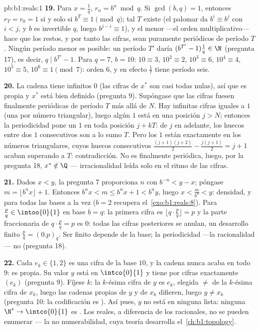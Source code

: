 \begin{solution}{pb:b1:reals:1}
\textbf{19.} Para $x = \frac 1q$, $r_n = b^n \bmod q$. Si
$\gcd(b, q) = 1$, entonces $r_T = r_0 = 1$ si y solo si $b^T \equiv 1
\pmod q$; tal $T$ existe (el palomar da $b^i \equiv b^j$ con $i < j$,
y $b$ es invertible  $q$, luego $b^{j-i} \equiv 1$), y el menor
---el orden multiplicativo--- hace que los restos, y por tanto las
cifras, sean puramente periódicos de período $T$. Ningún período menor
es posible: un período $T'$ daría $(b^{T'} - 1)\frac1q \in \N$
(pregunta 17), es decir, $q \mid b^{T'} - 1$. Para $q = 7$, $b = 10$:
$10 \equiv 3$, $10^2 \equiv 2$, $10^3 \equiv 6$, $10^4 \equiv 4$,
$10^5 \equiv 5$, $10^6 \equiv 1 \pmod 7$: orden $6$, y en efecto
$\frac 17$ tiene período seis.

\textbf{20.} La cadena tiene infinitos $0$ (las cifras de $x^*$ son
casi todas nulas), así que es propia y $x^*$ está bien definido
(pregunta 9). Supóngase que las cifras fuesen finalmente periódicas de
período $T$ más allá de $N$. Hay infinitas cifras iguales a $1$ (una
por número triangular), luego algún $1$ está en una posición $j > N$;
entonces la periodicidad pone un $1$ en toda posición $j + kT$: de $j$
en adelante, los huecos entre dos $1$ consecutivos son a lo sumo $T$.
Pero los $1$ están exactamente en los números triangulares, cuyos
huecos consecutivos $\frac{(j+1)(j+2)}{2} - \frac{j(j+1)}{2} = j + 1$
acaban superando a $T$: contradicción. No es finalmente periódica,
luego, por la pregunta 18, $x^* \notin \Q$ --- irracionalidad leída
solo en el ritmo de las cifras.

\textbf{21.} Dados $x < y$, la pregunta 7 proporciona $n$ con
$b^{-n} < y - x$; póngase $m = \lfloor b^n x \rfloor + 1$. Entonces
$b^n x < m \leq b^n x + 1 < b^n y$, luego $x < \frac{m}{b^n} < y$:
densidad, y para todas las bases a la vez ($b = 2$ recupera
el~\cref{exo:b1:reals:8}). Para $\frac pq \in \intoo{0}{1}$ en base
$b = q$: la primera cifra es $\lfloor q \cdot \frac pq \rfloor = p$ y
la parte fraccionaria de $q \cdot \frac pq = p$ es $0$: todas las
cifras posteriores se anulan, un desarrollo finito
$\frac pq = (0.p)_q$. Ser finito depende de la base; la periodicidad
---la racionalidad--- no (pregunta 18).

\textbf{22.} Cada $e_k \in \{1, 2\}$ es una cifra de la base $10$, y
la cadena nunca acaba en todo $9$: es propia. Su valor $y$ está en
$\intco{0}{1}$ y tiene por cifras exactamente $(e_k)$ (pregunta 9).
Fíjese $k$: la $k$-ésima cifra de $y$ es $e_k$, elegida $\neq$ de la
$k$-ésima cifra de $x_k$, luego las cadenas propias de $y$ y de $x_k$
difieren, luego $y \neq x_k$ (pregunta 10: la codificación es
). Así pues, $y$ no está en ninguna lista: ninguna
 $\N^* \to \intco{0}{1}$ es . Los reales, a
diferencia de los racionales, no se pueden enumerar --- la no
numerabilidad, cuya teoría desarrolla el~\cref{ch:b1:topology}.


\end{solution}
